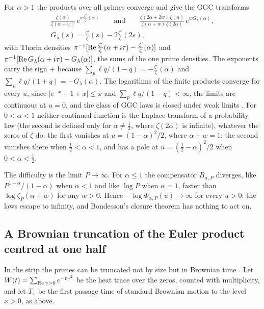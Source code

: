 \begin{remark}
For $\alpha>1$ the products over all primes converge and give the GGC transforms
\[
\begin{gathered}\frac{\zeta(\alpha)}{\zeta(\alpha+w)}\,e^{w\frac{\zeta'}{\zeta}(\alpha)}\qquad\text{and}\qquad\frac{\zeta(2\alpha+2w)\,\zeta(\alpha)}{\zeta(\alpha+w)\,\zeta(2\alpha)}\,e^{wG_\lambda(\alpha)},\\G_\lambda(s)=\frac{\zeta'}{\zeta}(s)-2\frac{\zeta'}{\zeta}(2s),\end{gathered}
\]
with Thorin densities $\pi^{-1}[\operatorname{Re}\frac{\zeta'}{\zeta}(\alpha+i\tau)-\frac{\zeta'}{\zeta}(\alpha)]$ and $\pi^{-1}[\operatorname{Re} G_\lambda(\alpha+i\tau)-G_\lambda(\alpha)]$, the sums of the one prime densities. The exponents carry the sign $+$ because $\sum_p\ell q/(1-q)=-\frac{\zeta'}{\zeta}(\alpha)$ and $\sum_p\ell q/(1+q)=-G_\lambda(\alpha)$. The logarithms of the finite products converge for every $u$, since $|e^{-x}-1+x|\le x$ and $\sum_p\ell q/(1-q)<\infty$, the limits are continuous at $u=0$, and the class of GGC laws is closed under weak limits \cite{Bondesson}. For $0<\alpha<1$ neither continued function is the Laplace transform of a probability law (the second is defined only for $\alpha\ne\frac12$, where $\zeta(2\alpha)$ is infinite), whatever the zeros of $\zeta$ do: the first vanishes at $u=(1-\alpha)^2/2$, where $\alpha+w=1$; the second vanishes there when $\frac12<\alpha<1$, and has a pole at $u=(\frac12-\alpha)^2/2$ when $0<\alpha<\frac12$.
\end{remark}

The difficulty is the limit $P\to\infty$. For $\alpha\le1$ the compensator $B_{\alpha,P}$ diverges, like $P^{1-\alpha}/(1-\alpha)$ when $\alpha<1$ and like $\log P$ when $\alpha=1$, faster than $\log\zeta_P(\alpha+w)$ for any $w>0$. Hence $-\log\Phi_{\alpha,P}(u)\to\infty$ for every $u>0$: the laws escape to infinity, and Bondesson's closure theorem has nothing to act on.

\subsection{A Brownian truncation of the Euler product centred at one half}\label{ht:sec:brownian}

In the strip the primes can be truncated not by size but in Brownian time \cite{PolsonRXi26}. Let $W(t)=\sum_{\operatorname{Re}\gamma>0}e^{-t\gamma^2}$ be the heat trace over the zeros, counted with multiplicity, and let $T_x$ be the first passage time of standard Brownian motion to the level $x>0$, as above.

